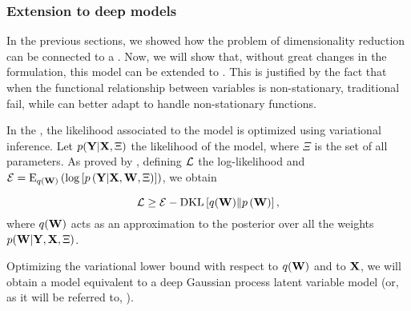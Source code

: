 \subsubsection{Extension to deep models}

In the previous sections, we showed how the problem of dimensionality reduction can be connected to a \gplvm. Now, we will show that, without great changes in the formulation, this model can be extended to \dgplvm. This is justified by the fact that when the functional relationship between variables is non-stationary, traditional  fail, while \dgp can better adapt to handle non-stationary functions.

In the \dgplvm, the likelihood associated to the model is optimized using variational inference. Let $p(\mathbf{Y}\vert\mathbf{X},\Xi)$ the likelihood of the model, where $\Xi$ is the set of all parameters. As proved by \citet{Filippone2017}, defining $\mathcal{L}$ the log-likelihood and $\mathcal{E} = \mathrm{E}_{q(\mathbf{W})} \left( \log\left[ p\left(\mathbf{Y} | \mathbf{X}, \mathbf{W}, \Xi\right) \right] \right)$, we obtain

\begin{equation}
\mathcal{L} \geq \mathcal{E}
- \mathrm{DKL}\left[q(\mathbf{W}) \| p\left(\mathbf{W}\right)\right] \text{,}
\end{equation}
where $q(\mathbf{W})$ acts as an approximation to the posterior over all the weights $p(\mathbf{W} | \mathbf{Y}, \mathbf{X}, \Xi)$.

Optimizing the variational lower bound with respect to $q(\mathbf{W})$ and to $\mathbf{X}$, we will obtain a model equivalent to a deep Gaussian process latent variable model (or, as it will be referred to, \dgplvm).
